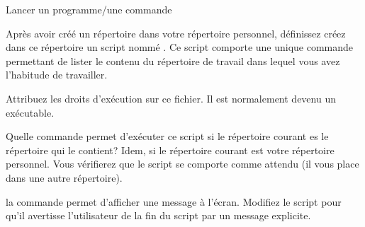 \begin{exercice}
  \begin{exercicelet}{Lancer un programme/une commande}
    \begin{questions}
    \item Après avoir créé un répertoire  dans votre répertoire
      personnel, définissez créez dans ce répertoire un script nommé
      . Ce script comporte une unique commande permettant de
      lister le contenu du répertoire de travail
       dans lequel vous avez l'habitude de travailler.
    \item Attribuez les droits d'exécution sur ce fichier. Il est normalement
      devenu un exécutable.
    \item Quelle commande permet d'exécuter ce script si le répertoire courant
      es le répertoire  qui le contient? Idem, si le répertoire
      courant est votre répertoire personnel. Vous vérifierez que le script se
      comporte comme attendu (il vous place dans une autre répertoire).
    \item la commande  permet d'afficher une message à
      l'écran. Modifiez le script pour qu'il avertisse l'utilisateur de la
      fin du script par un message explicite.
    \end{questions}
  \end{exercicelet}
\end{exercice}


